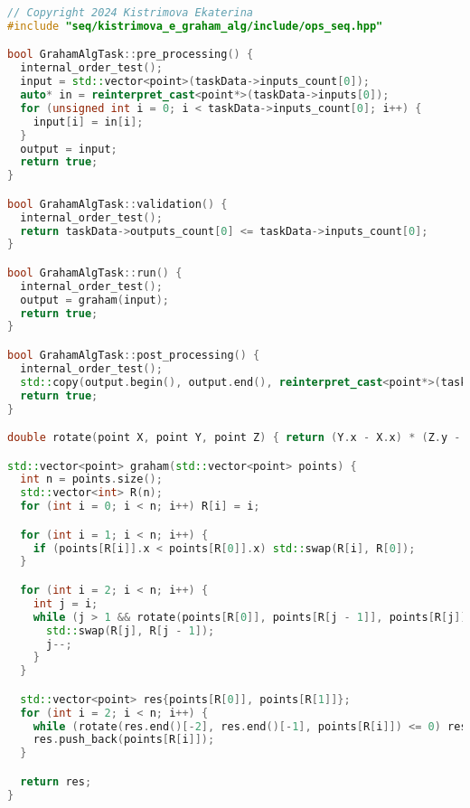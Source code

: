 \documentclass{report}
\begin{document}
\begin{lstlisting}[language=C++,caption=Последовательная версия]
// Copyright 2024 Kistrimova Ekaterina
#include "seq/kistrimova_e_graham_alg/include/ops_seq.hpp"

bool GrahamAlgTask::pre_processing() {
  internal_order_test();
  input = std::vector<point>(taskData->inputs_count[0]);
  auto* in = reinterpret_cast<point*>(taskData->inputs[0]);
  for (unsigned int i = 0; i < taskData->inputs_count[0]; i++) {
    input[i] = in[i];
  }
  output = input;
  return true;
}

bool GrahamAlgTask::validation() {
  internal_order_test();
  return taskData->outputs_count[0] <= taskData->inputs_count[0];
}

bool GrahamAlgTask::run() {
  internal_order_test();
  output = graham(input);
  return true;
}

bool GrahamAlgTask::post_processing() {
  internal_order_test();
  std::copy(output.begin(), output.end(), reinterpret_cast<point*>(taskData->outputs[0]));
  return true;
}

double rotate(point X, point Y, point Z) { return (Y.x - X.x) * (Z.y - Y.y) - (Y.y - X.y) * (Z.x - Y.x); }

std::vector<point> graham(std::vector<point> points) {
  int n = points.size();
  std::vector<int> R(n);
  for (int i = 0; i < n; i++) R[i] = i;

  for (int i = 1; i < n; i++) {
    if (points[R[i]].x < points[R[0]].x) std::swap(R[i], R[0]);
  }

  for (int i = 2; i < n; i++) {
    int j = i;
    while (j > 1 && rotate(points[R[0]], points[R[j - 1]], points[R[j]]) < 0) {
      std::swap(R[j], R[j - 1]);
      j--;
    }
  }

  std::vector<point> res{points[R[0]], points[R[1]]};
  for (int i = 2; i < n; i++) {
    while (rotate(res.end()[-2], res.end()[-1], points[R[i]]) <= 0) res.pop_back();
    res.push_back(points[R[i]]);
  }

  return res;
}
\end{lstlisting}

\newpage
\end{document}
